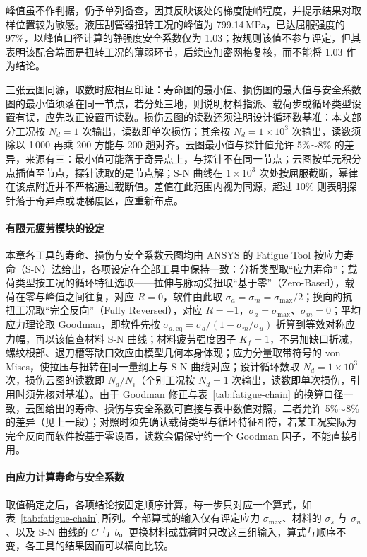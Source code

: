峰值虽不作判据，仍予单列备查，因其反映该处的梯度陡峭程度，并提示结果对取样位置较为敏感。液压刮管器扭转工况的峰值为 799.14\,MPa，已达屈服强度的 97\%，以峰值口径计算的静强度安全系数仅为 1.03；按规则该值不参与评定，但其表明该配合端面是扭转工况的薄弱环节，后续应加密网格复核，而不能将 1.03 作为结论。

三张云图同源，取数时应相互印证：寿命图的最小值、损伤图的最大值与安全系数图的最小值须落在同一节点，若分处三地，则说明材料指派、载荷步或循环类型设置有误，应先改正设置再读数。损伤云图的读数还须注明设计循环数基准：本文部分工况按 $N_d=1$ 次输出，读数即单次损伤；其余按 $N_d=1\times10^{3}$ 次输出，读数须除以 1\,000 再乘 200 方能与 200 趟对齐。云图最小值与探针值允许 5\%$\sim$8\% 的差异，来源有三：最小值可能落于奇异点上，与探针不在同一节点；云图按单元积分点插值至节点，探针读取的是节点解；S-N 曲线在 $1\times10^{3}$ 次处按屈服截断，幂律在该点附近并不严格通过截断值。差值在此范围内视为同源，超过 10\% 则表明探针落于奇异点或陡梯度区，应重新布点。

\paragraph{有限元疲劳模块的设定}
\label{ss:fatigue-module}
本章各工具的寿命、损伤与安全系数云图均由 ANSYS 的 Fatigue Tool 按应力寿命（S-N）法给出，各项设定在全部工具中保持一致：分析类型取“应力寿命”；载荷类型按工况的循环特征选取——拉伸与脉动受扭取“基于零”（Zero-Based），载荷在零与峰值之间往复，对应 $R=0$，软件由此取 $\sigma_a=\sigma_m=\sigma_{\max}/2$；换向的抗扭工况取“完全反向”（Fully Reversed），对应 $R=-1$，$\sigma_a=\sigma_{\max}$、$\sigma_m=0$；平均应力理论取 Goodman，即软件先按 $\sigma_{a,\mathrm{eq}}=\sigma_a/(1-\sigma_m/\sigma_u)$ 折算到等效对称应力幅，再以该值查材料 S-N 曲线；材料疲劳强度因子 $K_f=1$，不另加缺口折减，螺纹根部、退刀槽等缺口效应由模型几何本身体现；应力分量取带符号的 von Mises，使拉压与扭转在同一量纲上与 S-N 曲线对应；设计循环数取 $N_d=1\times10^{3}$ 次，损伤云图的读数即 $N_d/N_i$（个别工况按 $N_d=1$ 次输出，读数即单次损伤，引用时须先核对基准）。由于 Goodman 修正与表~\ref{tab:fatigue-chain} 的换算口径一致，云图给出的寿命、损伤与安全系数可直接与表中数值对照，二者允许 5\%$\sim$8\% 的差异（见上一段）；对照时须先确认载荷类型与循环特征相符，若某工况实际为完全反向而软件按基于零设置，读数会偏保守约一个 Goodman 因子，不能直接引用。

\paragraph{由应力计算寿命与安全系数}
\label{ss:fatigue-chain}
取值确定之后，各项结论按固定顺序计算，每一步只对应一个算式，如表~\ref{tab:fatigue-chain} 所列。全部算式的输入仅有评定应力 $\sigma_{\max}$、材料的 $\sigma_s$ 与 $\sigma_u$、以及 S-N 曲线的 $C$ 与 $b$。更换材料或载荷时只改这三组输入，算式与顺序不变，各工具的结果因而可以横向比较。

